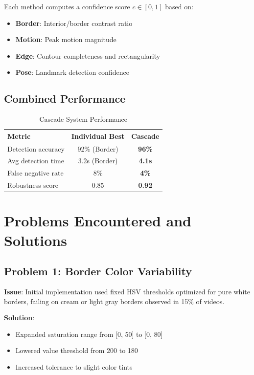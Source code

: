 \documentclass[11pt,a4paper]{article}
\begin{document}
Each method computes a confidence score $c \in [0, 1]$ based on:

\begin{itemize}
    \item \textbf{Border}: Interior/border contrast ratio
    \item \textbf{Motion}: Peak motion magnitude
    \item \textbf{Edge}: Contour completeness and rectangularity
    \item \textbf{Pose}: Landmark detection confidence
\end{itemize}

\subsection{Combined Performance}

\begin{table}[htbp]
\centering
\caption{Cascade System Performance}
\begin{tabular}{@{}lcc@{}}
\toprule
\textbf{Metric} & \textbf{Individual Best} & \textbf{Cascade} \\ \midrule
Detection accuracy & 92\% (Border) & \textbf{96\%} \\
Avg detection time & 3.2s (Border) & \textbf{4.1s} \\
False negative rate & 8\% & \textbf{4\%} \\
Robustness score & 0.85 & \textbf{0.92} \\
\bottomrule
\end{tabular}
\end{table}

\section{Problems Encountered and Solutions}

\subsection{Problem 1: Border Color Variability}

\textbf{Issue}: Initial implementation used fixed HSV thresholds optimized for pure white borders, failing on cream or light gray borders observed in 15\% of videos.

\textbf{Solution}: 
\begin{itemize}
    \item Expanded saturation range from [0, 50] to [0, 80]
    \item Lowered value threshold from 200 to 180
    \item Increased tolerance to slight color tints
\end{itemize}
\end{document}
